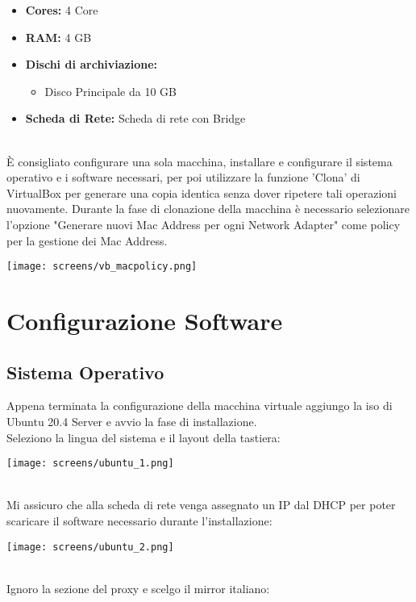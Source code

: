 \begin{itemize}
	\item \textbf{Cores:} 4 Core
	\item \textbf{RAM:} 4 GB
	\item \textbf{Dischi di archiviazione:}
		\begin{itemize}
			\item Disco Principale da 10 GB
		\end{itemize}
	\item \textbf{Scheda di Rete:} Scheda di rete con Bridge
\end{itemize}
\ \\
\`{E} consigliato configurare una sola macchina, installare e configurare il sistema operativo e i software necessari, per poi utilizzare la funzione 'Clona' di VirtualBox per generare una copia identica senza dover ripetere tali operazioni nuovamente. Durante la fase di clonazione della macchina \`{e} necessario selezionare l'opzione "Generare nuovi Mac Address per ogni Network Adapter" come policy per la gestione dei Mac Address.

\begin{center}
	\texttt{[image: screens/vb\_macpolicy.png]}
\end{center}

\section{Configurazione Software}

\subsection{Sistema Operativo}

Appena terminata la configurazione della macchina virtuale aggiungo la iso di Ubuntu 20.4 Server e avvio la fase di installazione.\\
Seleziono la lingua del sistema e il layout della tastiera:

\begin{center}
	\texttt{[image: screens/ubuntu\_1.png]}
\end{center}
\ \\
Mi assicuro che alla scheda di rete venga assegnato un IP dal DHCP per poter scaricare il software necessario durante l'installazione:

\begin{center}
	\texttt{[image: screens/ubuntu\_2.png]}
\end{center}
\ \\
Ignoro la sezione del proxy e scelgo il mirror italiano:

